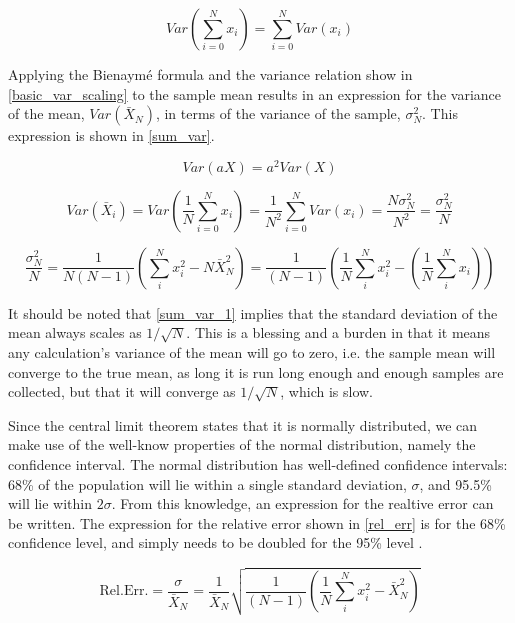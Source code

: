 \begin{equation}
\label{bien}
Var\left(\sum_{i=0}^N x_i \right) = \sum_{i=0}^N Var(x_i)
\end{equation}      


Applying the Bienaym\'e formula and the variance relation show in \eqref{basic_var_scaling} to the sample mean results in an expression for the variance of the mean, $Var(\bar{X}_N)$, in terms of the variance of the sample, $\sigma_N^2$.  This expression is shown in \eqref{sum_var}.  

\begin{equation}
\label{basic_var_scaling}
Var\left(a X \right) = a^2 Var\left( X \right)
\end{equation}

\begin{equation}
\label{sum_var_1}
Var(\bar{X}_i) = Var\left(\frac{1}{N}\sum_{i=0}^N x_i \right) = \frac{1}{N^2} \sum_{i=0}^N Var(x_i) = \frac{N\sigma_N^2}{N^2} =  \frac{\sigma_N^2}{N} 
\end{equation}

\begin{equation}
\label{sum_var}
 \frac{\sigma_N^2}{N} = \frac{1}{N(N-1)} \left( \sum_i^N x_i^2- N\bar{X}_N^2 \right) = \frac{1}{(N-1)} \left( \frac{1}{N} \sum_i^N x_i^2 - \left(   \frac{1}{N} \sum_i^N x_i \right)   \right)
\end{equation}

It should be noted that \eqref{sum_var_1} implies that the standard deviation of the mean always scales as $1/\sqrt{N}$.  This is a blessing and a burden in that it means any calculation's variance of the mean will go to zero, i.e. the sample mean will converge to the true mean, as long it is run long enough and enough samples are collected, but that it will converge as $1/\sqrt{N}$, which is slow.

Since the central limit theorem states that it is normally distributed, we can make use of the well-know properties of the normal distribution, namely the confidence interval.  The normal distribution has well-defined confidence intervals: 68\% of the population will lie within a single standard deviation, $\sigma$, and 95.5\% will lie within $2\sigma$.  From this knowledge, an expression for the realtive error can be written.  The expression for the relative error shown in \eqref{rel_err} is for the 68\% confidence level, and simply needs to be doubled for the 95\% level \cite{mcnp}\cite{jaakko}.

\begin{equation}
\label{rel_err}
\mathrm{Rel. Err.} = \frac{\sigma}{\bar{X}_N} = \frac{1}{\bar{X}_N}\sqrt{\frac{1}{(N-1)} \left( \frac{1}{N}\sum_i^N x_i^2-\bar{X}_N^2 \right)}
\end{equation}

